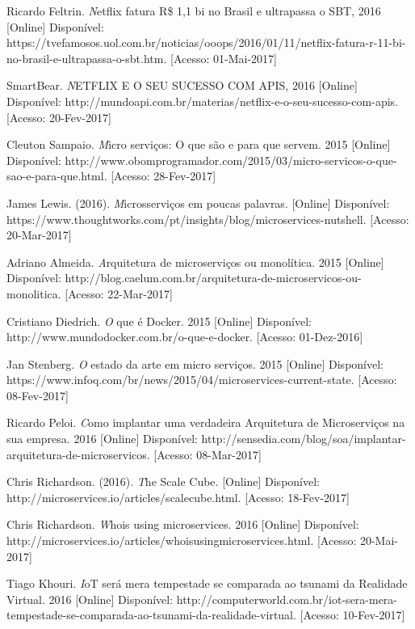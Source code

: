 \documentclass[journal]{IEEEtran}
\begin{document}
\begin{thebibliography}{1}
Ricardo Feltrin. \emph Netflix fatura R\$ 1,1 bi no Brasil e ultrapassa o SBT, 2016 [Online] Disponível: https://tvefamosos.uol.com.br/noticias/ooops/2016/01/11/netflix-fatura-r-11-bi-no-brasil-e-ultrapassa-o-sbt.htm. [Acesso: 01-Mai-2017]

SmartBear. \emph NETFLIX E O SEU SUCESSO COM APIS, 2016 [Online] Disponível: http://mundoapi.com.br/materias/netflix-e-o-seu-sucesso-com-apis. [Acesso: 20-Fev-2017] 

Cleuton Sampaio. \emph Micro serviços: O que são e para que servem. 2015 [Online] Disponível: http://www.obomprogramador.com/2015/03/micro-servicos-o-que-sao-e-para-que.html. [Acesso: 28-Fev-2017] 

James Lewis. (2016). \emph Microsserviços em poucas palavras. [Online] Disponível: https://www.thoughtworks.com/pt/insights/blog/microservices-nutshell. [Acesso: 20-Mar-2017]

Adriano Almeida. \emph Arquitetura de microserviços ou monolítica. 2015 [Online] Disponível: http://blog.caelum.com.br/arquitetura-de-microservicos-ou-monolitica. [Acesso: 22-Mar-2017]

Cristiano Diedrich. \emph O que é Docker. 2015 [Online] Disponível: http://www.mundodocker.com.br/o-que-e-docker. [Acesso: 01-Dez-2016]

Jan Stenberg. \emph O estado da arte em micro serviços. 2015 [Online] Disponível: https://www.infoq.com/br/news/2015/04/microservices-current-state. [Acesso: 08-Fev-2017]

Ricardo Peloi. \emph Como implantar uma verdadeira Arquitetura de Microserviços na sua empresa. 2016 [Online] Disponível: http://sensedia.com/blog/soa/implantar-arquitetura-de-microservicos. [Acesso: 08-Mar-2017]

Chris Richardson. (2016). \emph The Scale Cube. [Online] Disponível: http://microservices.io/articles/scalecube.html. [Acesso: 18-Fev-2017]

Chris Richardson. \emph Whois using microservices. 2016 [Online] Disponível: http://microservices.io/articles/whoisusingmicroservices.html. [Acesso: 20-Mai-2017]

Tiago Khouri. \emph IoT será mera tempestade se comparada ao tsunami da Realidade Virtual. 2016 [Online] Disponível: http://computerworld.com.br/iot-sera-mera-tempestade-se-comparada-ao-tsunami-da-realidade-virtual. [Acesso: 10-Fev-2017]


\end{thebibliography}
\end{document}

